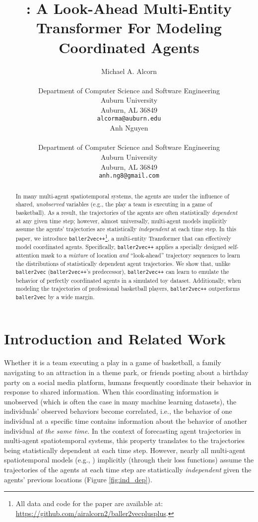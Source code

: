 \documentclass{article}
\title{\btvpp{}: A Look-Ahead Multi-Entity Transformer For Modeling Coordinated Agents}
\author{
  Michael A. Alcorn\\\\
  Department of Computer Science and Software Engineering\\
  Auburn University\\
  Auburn, AL 36849 \\
  \texttt{alcorma@auburn.edu} \\
  \And
  Anh Nguyen \\\\
  Department of Computer Science and Software Engineering\\
  Auburn University\\
  Auburn, AL 36849 \\
  \texttt{anh.ng8@gmail.com} \\
}
\newcommand{\btv}{\texttt{baller2vec}}
\newcommand{\btvpp}{\texttt{baller2vec++}}
\begin{document}
\maketitle

\begin{abstract}
In many multi-agent spatiotemporal systems, the agents are under the influence of shared, \textit{unobserved} variables (e.g., the play a team is executing in a game of basketball).
As a result, the trajectories of the agents are often statistically \textit{dependent} at any given time step; however, almost universally, multi-agent models implicitly assume the agents' trajectories are statistically \textit{independent} at each time step.
In this paper, we introduce \btvpp{}\footnote{All data and code for the paper are available at: \url{https://github.com/airalcorn2/baller2vecplusplus}.}, a multi-entity Transformer that can effectively model coordinated agents.
Specifically, \btvpp{} applies a specially designed self-attention mask to a \textit{mixture} of location \textit{and} ``look-ahead'' trajectory sequences to learn the distributions of statistically dependent agent trajectories.
We show that, unlike \btv{} (\btvpp{}'s predecessor), \btvpp{} can learn to emulate the behavior of perfectly coordinated agents in a simulated toy dataset.
Additionally, when modeling the trajectories of professional basketball players, \btvpp{} outperforms \btv{} by a wide margin. \end{abstract}

\section{Introduction and Related Work}
Whether it is a team executing a play in a game of basketball, a family navigating to an attraction in a theme park, or friends posting about a birthday party on a social media platform, humans frequently coordinate their behavior in response to shared information.
When this coordinating information is unobserved (which is often the case in many machine learning datasets), the individuals' observed behaviors become correlated, i.e., the behavior of one individual at a specific time contains information about the behavior of another individual \textit{at the same time}.
In the context of forecasting agent trajectories in multi-agent spatiotemporal systems, this property translates to the trajectories being statistically dependent at each time step.
However, nearly all multi-agent spatiotemporal models (e.g., \cite{felsen2018will, gupta2018social, sadeghian2019sophie, yeh2019diverse, YuMa2020Spatio, alcorn2021baller2vec}) implicitly (through their loss functions) assume the trajectories of the agents at each time step are statistically \textit{independent} given the agents' previous locations (Figure \ref{fig:ind_dep}).
\end{document}
